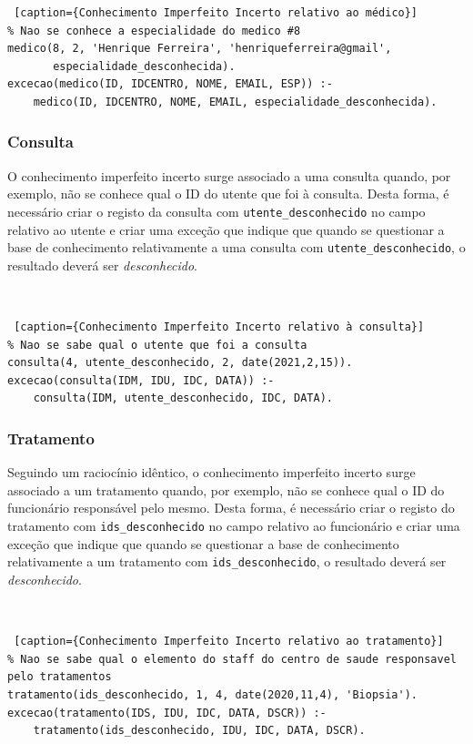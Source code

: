 \documentclass[a4paper, 11pt]{article}
\begin{document}
\begin{lstlisting} [caption={Conhecimento Imperfeito Incerto relativo ao médico}]
% Nao se conhece a especialidade do medico #8
medico(8, 2, 'Henrique Ferreira', 'henriqueferreira@gmail',
       especialidade_desconhecida).
excecao(medico(ID, IDCENTRO, NOME, EMAIL, ESP)) :-
    medico(ID, IDCENTRO, NOME, EMAIL, especialidade_desconhecida).
\end{lstlisting}

\subsubsection*{Consulta}

O conhecimento imperfeito incerto surge associado a uma consulta quando, por exemplo, não se 
conhece qual o ID do utente que foi à consulta. Desta forma, é necessário criar o registo da 
consulta com
\texttt{utente\_desconhecido} no campo relativo ao utente e criar uma exceção que indique que 
quando se questionar a base de conhecimento relativamente a uma consulta com 
\texttt{utente\_desconhecido}, o resultado deverá ser \textit{desconhecido}.

\

\begin{lstlisting} [caption={Conhecimento Imperfeito Incerto relativo à consulta}]
% Nao se sabe qual o utente que foi a consulta
consulta(4, utente_desconhecido, 2, date(2021,2,15)).
excecao(consulta(IDM, IDU, IDC, DATA)) :-
    consulta(IDM, utente_desconhecido, IDC, DATA).
\end{lstlisting}


\subsubsection*{Tratamento}

Seguindo um raciocínio idêntico, o conhecimento imperfeito incerto surge associado a um 
tratamento quando, por exemplo, não se conhece qual o ID do funcionário responsável pelo mesmo. 
Desta forma, é necessário criar o registo do tratamento com
\texttt{ids\_desconhecido} no campo relativo ao funcionário e criar uma exceção que indique que 
quando se questionar a base de conhecimento relativamente a um tratamento com 
\texttt{ids\_desconhecido}, o resultado deverá ser \textit{desconhecido}. 

\

\begin{lstlisting} [caption={Conhecimento Imperfeito Incerto relativo ao tratamento}]
% Nao se sabe qual o elemento do staff do centro de saude responsavel pelo tratamentos
tratamento(ids_desconhecido, 1, 4, date(2020,11,4), 'Biopsia').
excecao(tratamento(IDS, IDU, IDC, DATA, DSCR)) :-
    tratamento(ids_desconhecido, IDU, IDC, DATA, DSCR).
\end{lstlisting}
\end{document}
